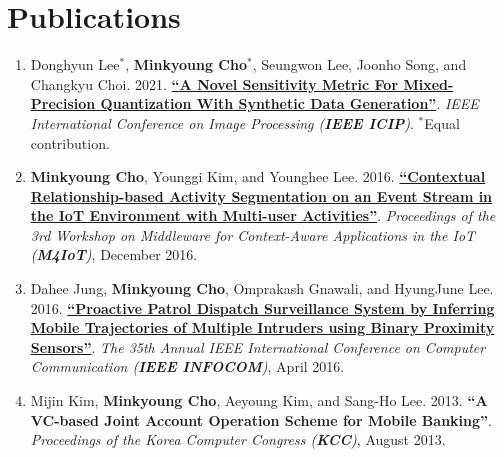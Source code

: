 \documentclass[letterpaper,oneside,11pt]{article}
\begin{document}
\section{Publications}
\begin{enumerate}[leftmargin=*, itemsep=0em]
  \item \small Donghyun Lee$^\ast$, \textbf{Minkyoung Cho$^\ast$}, Seungwon Lee, Joonho Song, and Changkyu Choi. 2021. \textbf{\href{https://ieeexplore.ieee.org/abstract/document/9506527}{``A Novel Sensitivity Metric For Mixed-Precision Quantization With Synthetic Data Generation''}}. \textit{IEEE International Conference on Image Processing (\textbf{IEEE ICIP})}. $^\ast$Equal contribution.
  \item \small \textbf{Minkyoung Cho}, Younggi Kim, and Younghee Lee. 2016. \textbf{\href{https://dl.acm.org/doi/10.1145/3008631.3008633}{``Contextual Relationship-based Activity Segmentation on an Event Stream in the IoT Environment with Multi-user Activities''}}. \textit{Proceedings of the 3rd Workshop on Middleware for Context-Aware Applications in the IoT (\textbf{M4IoT})}, December 2016.
  \item \small Dahee Jung, \textbf{Minkyoung Cho}, Omprakash Gnawali, and HyungJune Lee. 2016. \textbf{\href{https://ieeexplore.ieee.org/abstract/document/7524369}{``Proactive Patrol Dispatch Surveillance System by Inferring Mobile Trajectories of Multiple Intruders using Binary Proximity Sensors''}}. \textit{The 35th Annual IEEE International Conference on Computer Communication (\textbf{IEEE INFOCOM})}, April 2016.
  \item \small Mijin Kim, \textbf{Minkyoung Cho}, Aeyoung Kim, and Sang-Ho Lee. 2013. \textbf{``A VC-based Joint Account Operation Scheme for Mobile Banking''}. \textit{Proceedings of the Korea Computer Congress (\textbf{KCC})}, August 2013.
\end{enumerate}

\end{document}
